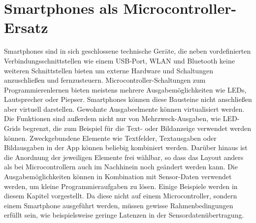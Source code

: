 \documentclass[11pt,a4paper]{report}
\begin{document}
\chapter{Smartphones als Microcontroller-Ersatz} \label{chap:Experimente}
Smartphones sind in sich geschlossene technische Geräte, die neben vordefinierten Verbindungsschnittstellen wie einem USB-Port, WLAN und Bluetooth keine weiteren Schnittstellen bieten um externe Hardware und Schaltungen anzuschließen und fernzusteuern.
Microcontroller-Schaltungen zum Programmierenlernen bieten meistens mehrere Ausgabemöglichkeiten wie LEDs, Lautsprecher oder Piepser.
Smartphones können diese Bausteine nicht anschließen aber virtuell darstellen.
Gewohnte Ausgabeelmente können virtualisiert werden.
Die Funktionen sind außerdem nicht nur von Mehrzweck-Ausgaben, wie LED-Grids begrenzt, die zum Beispiel für die Text- oder Bildanzeige verwendet werden können.
Zweckgebundene Elemente wie Textfelder, Textausgaben oder Bildausgaben in der App können beliebig kombiniert werden.
Darüber hinaus ist die Anordnung der jeweiligen Elemente frei wählbar, so dass das Layout anders als bei Microcontrollern auch im Nachhinein noch geändert werden kann.
Die Ausgabemöglichkeiten können in Kombination mit Sensor-Daten verwendet werden, um kleine Programmieraufgaben zu lösen.
Einige Beispiele werden in diesem Kapitel vorgestellt.
Da diese nicht auf einem Microcontroller, sondern einem Smartphone ausgeführt werden, müssen gewisse Rahmenbedingungen erfüllt sein, wie beispielsweise geringe Latenzen in der Sensordatenübertragung.
\end{document}
